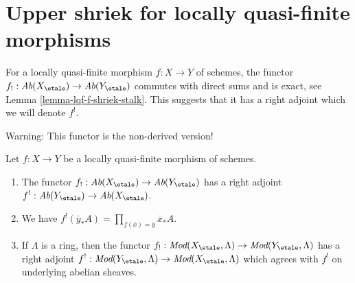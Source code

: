\section{Upper shriek for locally quasi-finite morphisms}
\label{section-duality-locally-quasi-finite}

\noindent
For a locally quasi-finite morphism $f : X \to Y$ of schemes, the
functor $f_! : \textit{Ab}(X_\etale) \to \textit{Ab}(Y_\etale)$ commutes
with direct sums and is exact, see Lemma \ref{lemma-lqf-f-shriek-stalk}.
This suggests that it has a right adjoint which we will denote $f^!$.

\medskip\noindent
Warning: This functor is the non-derived version!

\begin{lemma}
\label{lemma-lqf-f-upper-shriek}
Let $f : X \to Y$ be a locally quasi-finite morphism of schemes.
\begin{enumerate}
\item The functor $f_! : \textit{Ab}(X_\etale) \to \textit{Ab}(Y_\etale)$
has a right adjoint $f^! : \textit{Ab}(Y_\etale) \to \textit{Ab}(X_\etale)$.
\item We have
$f^!(\overline{y}_*A) = \prod_{f(\overline{x}) = \overline{y}} \overline{x}_*A$.
\item If $\Lambda$ is a ring, then the functor
$f_! : \textit{Mod}(X_\etale, \Lambda) \to \textit{Mod}(Y_\etale, \Lambda)$
has a right adjoint
$f^! : \textit{Mod}(Y_\etale, \Lambda) \to \textit{Mod}(X_\etale, \Lambda)$
which agrees with $f^!$ on underlying abelian sheaves.
\end{enumerate}
\end{lemma}

